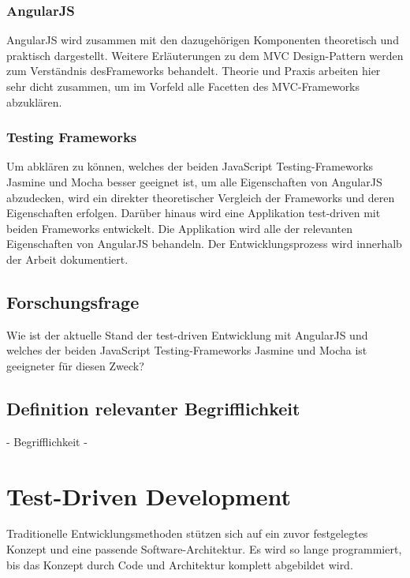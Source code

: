 \subsubsection{AngularJS}
AngularJS wird zusammen mit den dazugehörigen Komponenten theoretisch und praktisch dargestellt. Weitere Erläuterungen zu dem MVC Design-Pattern werden zum Verständnis desFrameworks behandelt. Theorie und Praxis arbeiten hier sehr dicht zusammen, um im Vorfeld alle Facetten des MVC-Frameworks abzuklären.

\subsubsection{Testing Frameworks}
Um abklären zu können, welches der beiden JavaScript Testing-Frameworks 
{\glqq Jasmine\grqq} und {\glqq Mocha\grqq} besser geeignet ist, um alle
Eigenschaften von AngularJS abzudecken, wird ein direkter theoretischer
Vergleich der Frameworks und deren Eigenschaften erfolgen. Darüber hinaus wird 
eine Applikation test-driven mit beiden Frameworks entwickelt. Die Applikation
wird alle der relevanten Eigenschaften von AngularJS behandeln. Der 
Entwicklungsprozess wird innerhalb der Arbeit dokumentiert.

\subsection{Forschungsfrage}
Wie ist der aktuelle Stand der test-driven Entwicklung mit AngularJS und welches der beiden JavaScript Testing-Frameworks {\glqq Jasmine\grqq} und {\glqq Mocha\grqq} ist geeigneter für diesen Zweck?

\subsection{Definition relevanter Begrifflichkeit}
 - Begrifflichkeit -

\newpage

\section{Test-Driven Development}
\label{section:Test-Driven Development}
\begin{center}
 \autocite[22]{Johansen:2011}
\end{center}
Traditionelle Entwicklungsmethoden stützen sich auf ein zuvor festgelegtes Konzept und eine passende Software-Architektur. Es wird so lange programmiert, bis das Konzept durch Code und Architektur komplett abgebildet wird.

